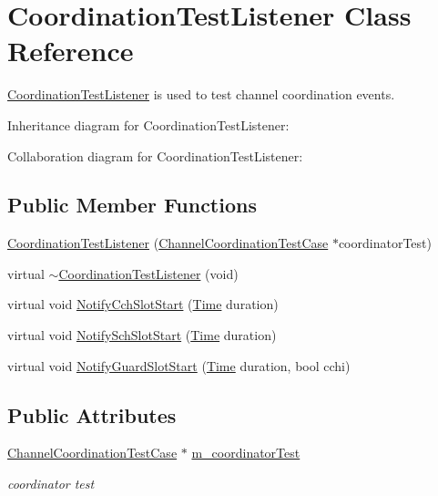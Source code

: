 \hypertarget{classCoordinationTestListener}{}\section{Coordination\+Test\+Listener Class Reference}
\label{classCoordinationTestListener}


\hyperlink{classCoordinationTestListener}{Coordination\+Test\+Listener} is used to test channel coordination events.  




Inheritance diagram for Coordination\+Test\+Listener\+:


Collaboration diagram for Coordination\+Test\+Listener\+:
\subsection*{Public Member Functions}
\begin{DoxyCompactItemize}
\item 
\hyperlink{classCoordinationTestListener_adba5b103b61c2339d9dd7d4f02a1045e}{Coordination\+Test\+Listener} (\hyperlink{classChannelCoordinationTestCase}{Channel\+Coordination\+Test\+Case} $\ast$coordinator\+Test)
\item 
virtual \hyperlink{classCoordinationTestListener_a3a7cc88778262491b12accc562814add}{$\sim$\+Coordination\+Test\+Listener} (void)
\item 
virtual void \hyperlink{classCoordinationTestListener_ac5349fdffffecf03e0cc707061792899}{Notify\+Cch\+Slot\+Start} (\hyperlink{classns3_1_1Time}{Time} duration)
\item 
virtual void \hyperlink{classCoordinationTestListener_aba9982b9c1c1f6d20d1880a6e628f88a}{Notify\+Sch\+Slot\+Start} (\hyperlink{classns3_1_1Time}{Time} duration)
\item 
virtual void \hyperlink{classCoordinationTestListener_ab665b252d871b5576a99ac17626c7427}{Notify\+Guard\+Slot\+Start} (\hyperlink{classns3_1_1Time}{Time} duration, bool cchi)
\end{DoxyCompactItemize}
\subsection*{Public Attributes}
\begin{DoxyCompactItemize}
\item 
\hyperlink{classChannelCoordinationTestCase}{Channel\+Coordination\+Test\+Case} $\ast$ \hyperlink{classCoordinationTestListener_a3ec2520e8fad7ccfca8309cec06c5cd6}{m\+\_\+coordinator\+Test}
\begin{DoxyCompactList}\small\item\em coordinator test \end{DoxyCompactList}\end{DoxyCompactItemize}
